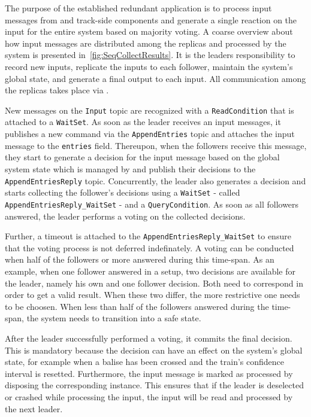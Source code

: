 The purpose of the established redundant application is to process input messages from  and track-side components and generate a single reaction on the input for the entire system based on majority voting.
A coarse overview about how input messages are distributed among the replicas and processed by the system is presented in~\autoref{fig:SeqCollectResults}.
It is the leaders responsibility to record new inputs, replicate the inputs to each follower, maintain the system's global state, and generate a final output to each input.
All communication among the replicas takes place via .

New messages on the \texttt{Input} topic are recognized with a \texttt{ReadCondition} that is attached to a \texttt{WaitSet}.
As soon as the leader receives an input messages, it publishes a new command via the \texttt{AppendEntries} topic and attaches the input message to the \texttt{entries} field.
Thereupon, when the followers receive this message, they start to generate a decision for the input message based on the global system state which is managed by  and publish their decisions to the \texttt{AppendEntriesReply} topic.
Concurrently, the leader also generates a decision and starts collecting the follower's decisions using a \texttt{WaitSet} - called \texttt{AppendEntriesReply\_WaitSet} - and a \texttt{QueryCondition}.
As soon as all followers answered, the leader performs a voting on the collected decisions.

Further, a timeout is attached to the \texttt{AppendEntriesReply\_WaitSet} to ensure that the voting process is not deferred indefinately.
A voting can be conducted when half of the followers or more answered during this time-span.
As an example, when one follower answered in a  setup, two decisions are available for the leader, namely his own and one follower decision.
Both need to correspond in order to get a valid result.
When these two differ, the more restrictive one needs to be choosen.
When less than half of the followers answered during the time-span, the system needs to transition into a safe state.

After the leader successfully performed a voting, it commits the final decision.
This is mandatory because the decision can have an effect on the system's global state, for example when a balise has been crossed and the train's confidence interval is resetted.
Furthermore, the input message is marked as processed by disposing the corresponding  instance.
This ensures that if the leader is deselected or crashed while processing the input, the input will be read and processed by the next leader.

